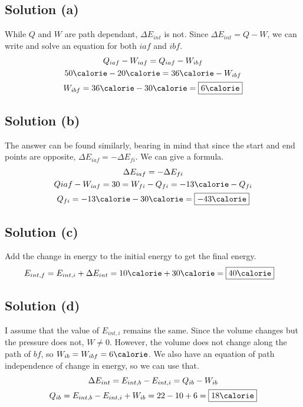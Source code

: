 \documentclass[12pt]{article}
\begin{document}
        \subsection{Solution (a)}
            While $Q$ and $W$ are path dependant, $\Delta E_{int}$ is not.
            Since $\Delta E_{int} = Q - W$, we can write and solve an equation for both $iaf$ and $ibf$. 
            \begin{gather}
                Q_{iaf} - W_{iaf} = Q_{iaf} - W_{ibf}\\
                50 \unit{\calorie} - 20 \unit{\calorie} = 36 \unit{\calorie} - W_{ibf}\\
                W_{ibf} = 36 \unit{\calorie} - 30 \unit{\calorie} = \boxed{6 \unit{\calorie}}
            \end{gather}

        \subsection{Solution (b)}
            The answer can be found similarly, bearing in mind that since the start and end points are opposite, $\Delta E_{iaf} = -\Delta E_{fi}$. 
            We can give a formula.
            \begin{gather}
                \Delta E_{iaf} = -\Delta E_{fi}\\
                Q{iaf} - W_{iaf} = 30 \unit{\cal} = W_{fi} - Q_{fi} = -13\unit{\calorie} - Q_{fi}\\
                Q_{fi} = -13 \unit{\calorie} - 30 \unit{\calorie} = \boxed{-43 \unit{\calorie}}
            \end{gather}

        \subsection{Solution (c)}
            Add the change in energy to the initial energy to get the final energy.
            \begin{align}
                E_{int,f}   &=  E_{int,i} + \Delta E_{int}
                    =   10 \unit{\calorie} + 30 \unit{\calorie}
                    =   \boxed{40 \unit{\calorie}}
            \end{align}

        \subsection{Solution (d)}
            I assume that the value of $E_{int,i}$ remains the same.
            Since the volume changes but the pressure does not, $W \neq 0$. 
            However, the volume does not change along the path of $bf$, so $W_{ib} = W_{ibf} = 6 \unit{\calorie}$. 
            We also have an equation of path independence of change in energy, so we can use that. 
            \begin{gather}
                \Delta E_{int} = E_{int,b} - E_{int,i} = Q_{ib} - W_{ib}\\
                Q_{ib} = E_{int,b} - E_{int,i} + W_{ib} = 22 - 10 + 6 = \boxed{18 \unit{\calorie}}
            \end{gather}
\end{document}
